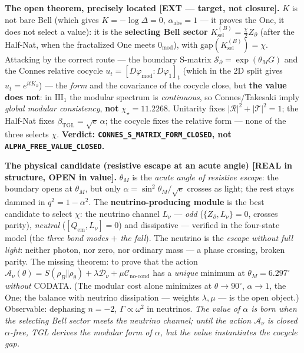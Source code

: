 \documentclass[11pt]{article}
\newcommand{\bTGL}{\beta_{\mathrm{TGL}}}\newcommand{\Msun}{M_{\odot}}\newcommand{\TGL}{\mathrm{TGL}}
\theoremstyle{definition}\newtheorem{deriv}{Derivation}
\begin{document}
\textbf{The open theorem, precisely located \textsf{[EXT --- target, not closure]}.} $K$ is not bare Bell (which gives $K=-\log\Delta=0$, $\alpha_{\mathrm{abs}}=1$ --- it proves the One, it does not select a value): it is the \textbf{selecting Bell sector} $K_{\mathrm{sel}}^{(B)}=\tfrac\chi2 Z_\partial$ (after the Half-Nat, when the fractalized One meets $0_{\mathrm{mod}}$), with $\mathrm{gap}(K_{\mathrm{sel}}^{(B)})=\chi$. Attacking by the correct route --- the boundary S-matrix $\mathcal{S}_\partial=\exp(\theta_M G)$ and the Connes relative cocycle $u_t=[D\varphi_{\mathrm{mod}}:D\varphi_1]_t$ (which in the 2D split gives $u_t=e^{itK_\partial}$) --- the \emph{form} and the covariance of the cocycle close, but \textbf{the value does not}: in $\mathrm{III}_1$ the modular spectrum is \emph{continuous}, so Connes/Takesaki imply \emph{global modular consistency}, \textbf{not} $\chi_\star=11.2268$. Unitarity fixes $|\mathcal R|^2+|\mathcal T|^2=1$; the Half-Nat fixes $\bTGL=\sqrt e\,\alpha$; the cocycle fixes the relative form --- none of the three selects $\chi$. \textbf{Verdict: \texttt{CONNES\_S\_MATRIX\_FORM\_CLOSED}, not \texttt{ALPHA\_FREE\_VALUE\_CLOSED}.}

\textbf{The physical candidate (resistive escape at an acute angle) \textsf{[REAL in structure, OPEN in value]}.} $\theta_M$ is the \emph{acute angle of resistive escape}: the boundary opens at $\theta_M$, but only $\alpha=\sin^2\theta_M/\sqrt e$ crosses as light; the rest stays dammed in $q^2=1-\alpha^2$. The \textbf{neutrino-producing module} is the best candidate to select $\chi$: the neutrino channel $L_\nu$ --- \emph{odd} ($\{Z_\partial,L_\nu\}=0$, crosses parity), \emph{neutral} ($[Q_{\mathrm{em}},L_\nu]=0$) and dissipative --- verified in the four-state model (the \emph{three bond modes $+$ the fall}). The neutrino is the \emph{escape without full light}: neither photon, nor zero, nor ordinary mass --- a phase crossing, broken parity. The missing theorem: to prove that the action $\mathcal A_\nu(\theta)=S(\rho_B\Vert\rho_\theta)+\lambda\mathcal D_\nu+\mu\mathcal C_{\mathrm{no\text{-}cond}}$ has a \emph{unique} minimum at $\theta_M=6.297^\circ$ \emph{without} CODATA. (The modular cost alone minimizes at $\theta\to90^\circ$, $\alpha\to1$, the One; the balance with neutrino dissipation --- weights $\lambda,\mu$ --- is the open object.) Observable: dephasing $n=-2$, $\Gamma\propto\omega^2$ in neutrinos. \emph{The value of $\alpha$ is born when the selecting Bell sector meets the neutrino channel; until the action $\mathcal A_\nu$ is closed $\alpha$-free, TGL derives the modular form of $\alpha$, but the value instantiates the cocycle gap.}
\end{document}
